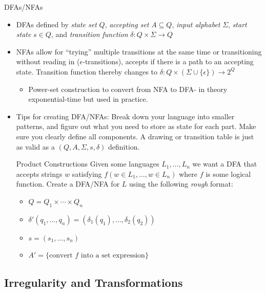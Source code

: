 \documentclass{beamer}
\begin{document}
\begin{frame}[t]{DFAs/NFAs}
    \begin{itemize}
        \item DFAs defined by \textit{state set} $Q$, \textit{accepting set} $A \subseteq Q$, \textit{input alphabet} $\Sigma$, \textit{start state} $s \in Q$, and \textit{transition function} $\delta: Q \times\Sigma \rightarrow Q$
        \item NFAs allow for ``trying'' multiple transitions at the same time or transitioning without reading in ($\epsilon$-transitions), accepts if there is a path to an accepting state. Transition function thereby changes to $\delta: Q \times(\Sigma \cup\{\epsilon\}) \rightarrow 2^Q$
        \begin{itemize}
            \item Power-set construction to convert from NFA to DFA- in theory exponential-time but used in practice.
        \end{itemize}
        \item \alert{Tips for creating DFA/NFAs}: Break down your language into smaller patterns, and figure out what you need to store as state for each part. Make sure you clearly define all components. A drawing or transition table is just as valid as a $(Q,A,\Sigma, s, \delta)$ definition. \pause
        \begin{block}{Product Constructions}
            Given some languages $L_1, \dots, L_n$ we want a DFA that accepts strings $w$ satisfying $f(w \in L_1,\dots,w \in L_n)$ where $f$ is some logical function. Create a DFA/NFA for $L$ using the following \textit{rough} format:
            \begin{itemize}
                \item $Q = Q_1 \times \cdots \times Q_n$
                \item $\delta'(q_1,\dots,q_n) = (\delta_1(q_1),\dots,\delta_2(q_2))$
                \item $s = (s_1,\dots,s_n)$
                \item $A' = \{\text{convert $f$ into a set expression}\}$
            \end{itemize}
        \end{block}
    \end{itemize}
\end{frame}

\subsection{Irregularity and Transformations}
\end{document}
